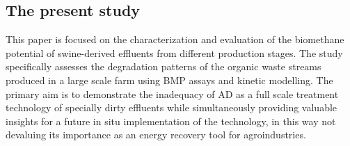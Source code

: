 \subsection{The present study}
This paper is focused on the characterization and evaluation of the biomethane potential of swine-derived effluents from different production stages. The study specifically assesses the degradation patterns of the organic waste streams produced in a large scale farm using BMP assays and kinetic modelling. The primary aim is to demonstrate the inadequacy of AD as a full scale treatment technology of specially dirty effluents while simultaneously providing valuable insights for a future in situ implementation of the technology, in this way not devaluing its importance as an energy recovery tool for agroindustries.